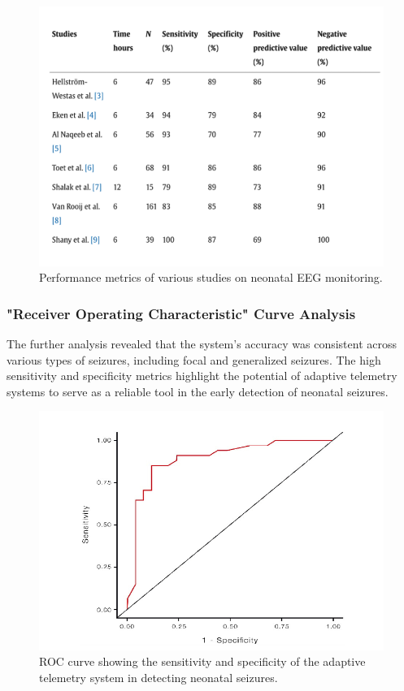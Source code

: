 \documentclass[12pt,journal,compsoc]{IEEEtran}
\begin{document}
\begin{figure}[H]
    \centering
    \includegraphics[width=1.0\linewidth]{studies_predictive_values_sensitivity_specitivity.png}
    \caption{Performance metrics of various studies on neonatal EEG monitoring.}
    \label{fig:performance_metrics}
\end{figure}

\subsubsection{"Receiver Operating Characteristic" Curve Analysis}

The further analysis revealed that the system's accuracy was consistent across various types of seizures, including focal and generalized seizures. The high sensitivity and specificity metrics highlight the potential of adaptive telemetry systems to serve as a reliable tool in the early detection of neonatal seizures.

\begin{figure}[H]
    \centering
    \includegraphics[width=0.8\linewidth]{sensitivity_vs_specitivity.png}
    \caption{ROC curve showing the sensitivity and specificity of the adaptive telemetry system in detecting neonatal seizures.}
    \label{fig:roc_curve}
\end{figure}
\end{document}
